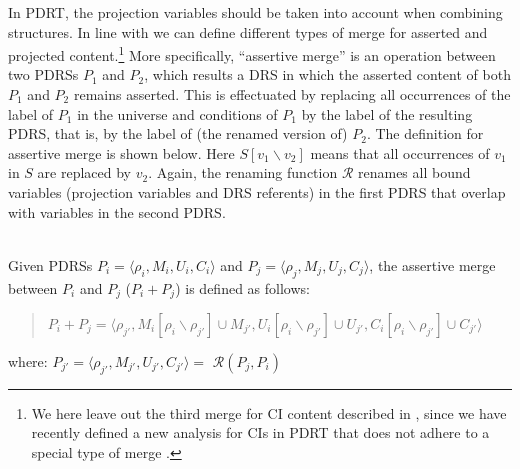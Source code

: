 In PDRT, the projection variables should be taken into account when
combining structures.  In line with  we can
define different types of merge for asserted and projected
content.\footnote{We here leave out the third merge for CI content described
in , since we have recently defined a new
analysis for CIs in PDRT that does not adhere to a special type of merge
\cite{venhuizenInPrepSALT}.} More specifically, ``assertive merge'' is an
operation between two PDRSs $P_1$ and $P_2$, which results a DRS in which
the asserted content of both $P_1$ and $P_2$ remains asserted. This is
effectuated by replacing all occurrences of the label of $P_1$ in the
universe and conditions of $P_1$ by the label of the resulting PDRS, that
is, by the label of (the renamed version of) $P_2$. The definition for
assertive merge is shown below. Here $S[v_1\backslash v_2]$ means that all
occurrences of $v_1$ in $S$ are replaced by $v_2$. Again, the renaming
function $\mathcal{R}$ renames all bound variables (projection variables and
DRS referents) in the first PDRS that overlap with variables in the second
PDRS.

\begin{definition}\label{def:amerge}~\\
Given PDRSs $P_i=\langle \rho_i,M_i,U_i,C_i \rangle$ and
$P_j=\langle \rho_j,M_j,U_j,C_j \rangle$, the assertive merge between $P_i$
and $P_j$ ($P_i + P_j$) is defined as follows:
  \begin{quote}
    $P_i + P_j = 
      \langle \rho_{j'}, 
      M_{i}[\rho_i\backslash\rho_{j'}] \cup M_{j'},
      U_{i}[\rho_i\backslash\rho_{j'}] \cup U_{j'},
      C_{i}[\rho_i\backslash\rho_{j'}] \cup C_{j'}\rangle$
  \end{quote}
  where: $P_{j'} = \langle \rho_{j'}, M_{j'}, U_{j'}, C_{j'} \rangle =$
      $\mathcal{R}(P_j,P_i)$
\end{definition}

